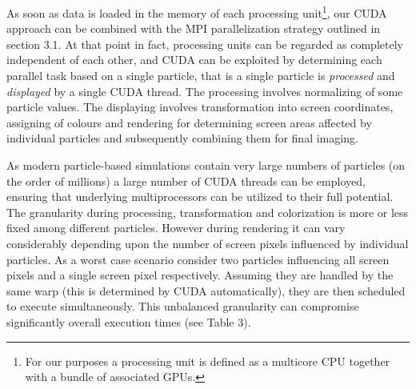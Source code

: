 \documentclass[1p,times]{elsarticle}
\begin{document}
As soon as data is loaded in the memory of each processing unit\footnote{For our purposes a processing unit is defined as a multicore CPU together with a bundle of associated GPUs.}, our CUDA approach can be combined with the MPI parallelization strategy outlined in section 3.1. At that point in fact, processing units can be regarded as completely independent of each other, and CUDA can be exploited by determining each parallel task based on a single particle, that is a single particle is {\it processed} and {\it displayed} by a single CUDA thread. 
The processing involves normalizing of some particle values. 
The displaying involves transformation into screen coordinates, assigning of colours and rendering for determining screen areas affected by individual particles and subsequently combining them for final imaging.

As modern particle-based simulations contain very large numbers of particles 
(on the order of millions) a large number of CUDA threads can be employed,
ensuring that underlying multiprocessors can be utilized to their full potential. 
The granularity during processing, transformation and colorization is more or 
less fixed among different particles. However during rendering it 
can vary considerably depending upon the number of screen pixels influenced 
by individual particles. As a worst case scenario consider two particles influencing 
all screen pixels and a single screen pixel respectively. Assuming they are handled by the same warp (this is determined by CUDA automatically), 
they are then scheduled to execute simultaneously. This unbalanced granularity 
can compromise significantly overall execution times (see Table 3).

\end{document}

